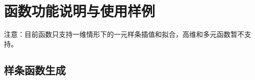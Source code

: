 \section{函数功能说明与使用样例}

 {\kaishu \large 注意：目前函数只支持一维情形下的一元样条插值和拟合，高维和多元函数暂不支持。}

\subsection{样条函数生成}







\clearpage